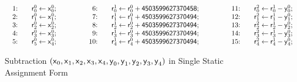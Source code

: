 \begin{figure}[h]
  \centering
  \[
  \begin{array}{lclcl}
    \begin{array}{rcl}
    \textmd{1:} && \dslcode{r}^0_0 \leftarrow \dslcode{x}^0_0; \\
    \textmd{2:} && \dslcode{r}^0_1 \leftarrow \dslcode{x}^0_1; \\
    \textmd{3:} && \dslcode{r}^0_2 \leftarrow \dslcode{x}^0_2; \\
    \textmd{4:} && \dslcode{r}^0_3 \leftarrow \dslcode{x}^0_3; \\
    \textmd{5:} && \dslcode{r}^0_5 \leftarrow \dslcode{x}^0_4; \\
    \end{array}
    &\hspace{.05\textwidth}&
    \begin{array}{rcl}
    \textmd{6:} && 
      \dslcode{r}^1_0 \leftarrow \dslcode{r}^0_0 + \dslcode{4503599627370458}; \\
    \textmd{7:} &&
      \dslcode{r}^1_1 \leftarrow \dslcode{r}^0_1 + \dslcode{4503599627370494}; \\
    \textmd{8:} &&
      \dslcode{r}^1_2 \leftarrow \dslcode{r}^0_2 + \dslcode{4503599627370494}; \\
    \textmd{9:} &&
      \dslcode{r}^1_3 \leftarrow \dslcode{r}^0_3 + \dslcode{4503599627370494}; \\
    \textmd{10:} && 
      \dslcode{r}^1_4 \leftarrow \dslcode{r}^0_4 + \dslcode{4503599627370494};\\
    \end{array}
    &\hspace{.05\textwidth}&
    \begin{array}{rcl}
    \textmd{11:} && \dslcode{r}^2_0 \leftarrow \dslcode{r}^1_0 - \dslcode{y}^0_0; \\
    \textmd{12:} && \dslcode{r}^2_1 \leftarrow \dslcode{r}^1_1 - \dslcode{y}^0_1; \\
    \textmd{13:} && \dslcode{r}^2_2 \leftarrow \dslcode{r}^1_2 - \dslcode{y}^0_2; \\
    \textmd{14:} && \dslcode{r}^2_3 \leftarrow \dslcode{r}^1_3 - \dslcode{y}^0_3; \\
    \textmd{15:} && \dslcode{r}^2_4 \leftarrow \dslcode{r}^1_4 - \dslcode{y}^0_4;
    \end{array}
  \end{array}
  \]
  \caption{Subtraction $(\mbox{\textsf{x}}_0, \mbox{\textsf{x}}_1, 
    \mbox{\textsf{x}}_2, \mbox{\textsf{x}}_3, \mbox{\textsf{x}}_4, \mbox{\textsf{y}}_0,
    \mbox{\textsf{y}}_1, \mbox{\textsf{y}}_2, \mbox{\textsf{y}}_3, \mbox{\textsf{y}}_4)$ in Single 
    Static Assignment Form}
  \label{figure:dsl:subtraction-ssa}
\end{figure}

